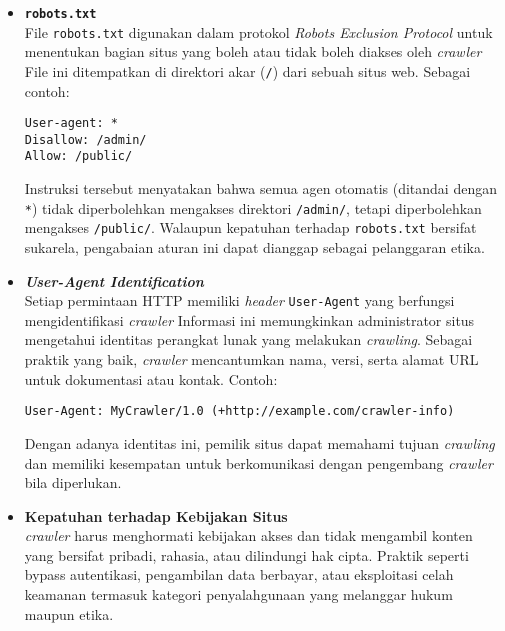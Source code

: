 \begin{itemize}
  \item \textbf{\texttt{robots.txt}} \\
  File \texttt{robots.txt} digunakan dalam protokol \textit{Robots Exclusion Protocol} untuk menentukan bagian situs yang boleh atau tidak boleh diakses oleh \textit{crawler} File ini ditempatkan di direktori akar (\texttt{/}) dari sebuah situs web. Sebagai contoh:
\begin{verbatim}
User-agent: *
Disallow: /admin/
Allow: /public/
\end{verbatim}
  Instruksi tersebut menyatakan bahwa semua agen otomatis (ditandai dengan \texttt{*}) tidak diperbolehkan mengakses direktori \texttt{/admin/}, tetapi diperbolehkan mengakses \texttt{/public/}. Walaupun kepatuhan terhadap \texttt{robots.txt} bersifat sukarela, pengabaian aturan ini dapat dianggap sebagai pelanggaran etika.

  \item \textbf{\textit{User-Agent Identification}} \\
  Setiap permintaan HTTP memiliki \textit{header} \texttt{User-Agent} yang berfungsi mengidentifikasi \textit{crawler} Informasi ini memungkinkan administrator situs mengetahui identitas perangkat lunak yang melakukan \textit{crawling}. Sebagai praktik yang baik, \textit{crawler} mencantumkan nama, versi, serta alamat URL untuk dokumentasi atau kontak. Contoh:
\begin{verbatim}
User-Agent: MyCrawler/1.0 (+http://example.com/crawler-info)
\end{verbatim}
  Dengan adanya identitas ini, pemilik situs dapat memahami tujuan \textit{crawling} dan memiliki kesempatan untuk berkomunikasi dengan pengembang \textit{crawler} bila diperlukan.

  \item \textbf{Kepatuhan terhadap Kebijakan Situs} \\
  \textit{crawler} harus menghormati kebijakan akses dan tidak mengambil konten yang bersifat pribadi, rahasia, atau dilindungi hak cipta. Praktik seperti bypass autentikasi, pengambilan data berbayar, atau eksploitasi celah keamanan termasuk kategori penyalahgunaan yang melanggar hukum maupun etika.
\end{itemize}